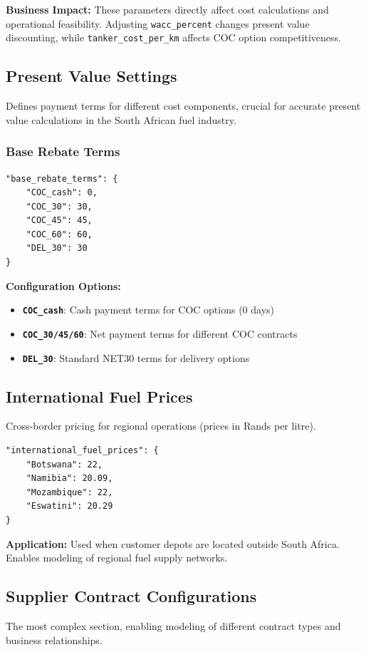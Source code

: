 \textbf{Business Impact:} These parameters directly affect cost calculations and operational feasibility. Adjusting \texttt{wacc\_percent} changes present value discounting, while \texttt{tanker\_cost\_per\_km} affects COC option competitiveness.

\subsection{Present Value Settings}
Defines payment terms for different cost components, crucial for accurate present value calculations in the South African fuel industry.

\subsubsection{Base Rebate Terms}
\begin{verbatim}
"base_rebate_terms": {
    "COC_cash": 0,
    "COC_30": 30,
    "COC_45": 45,
    "COC_60": 60,
    "DEL_30": 30
}
\end{verbatim}

\textbf{Configuration Options:}
\begin{itemize}
    \item \textbf{\texttt{COC\_cash}}: Cash payment terms for COC options (0 days)
    \item \textbf{\texttt{COC\_30/45/60}}: Net payment terms for different COC contracts
    \item \textbf{\texttt{DEL\_30}}: Standard NET30 terms for delivery options
\end{itemize}

\subsection{International Fuel Prices}
Cross-border pricing for regional operations (prices in Rands per litre).

\begin{verbatim}
"international_fuel_prices": {
    "Botswana": 22,
    "Namibia": 20.09,
    "Mozambique": 22,
    "Eswatini": 20.29
}
\end{verbatim}

\textbf{Application:} Used when customer depots are located outside South Africa. Enables modeling of regional fuel supply networks.

\subsection{Supplier Contract Configurations}
The most complex section, enabling modeling of different contract types and business relationships.

